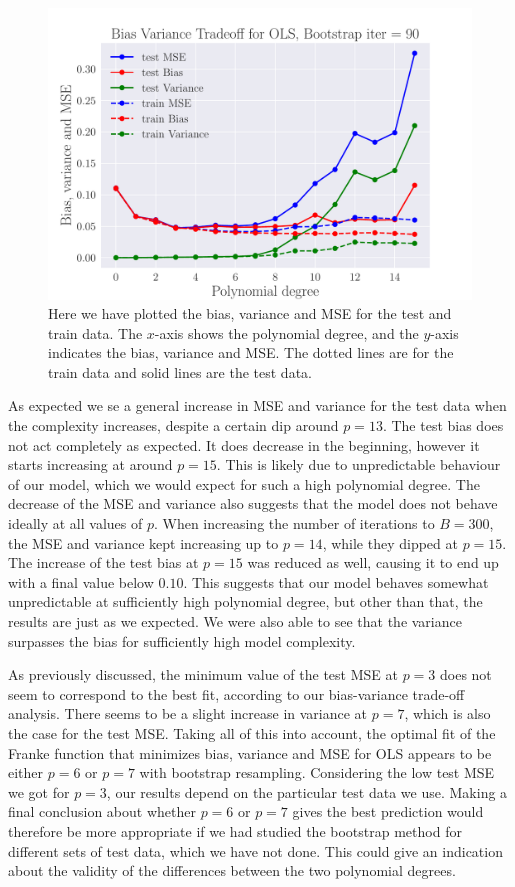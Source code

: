 \documentclass[reprint,english,notitlepage,aps,nobalancelastpage,nofootinbib]{revtex4-1}  %
\begin{document}
\begin{figure}[h]
	\includegraphics[width=\linewidth]{BVT_OLS_n30_eps0_2.pdf}
	\caption{Here we have plotted the bias, variance and MSE for the test and train data. The $x$-axis shows the polynomial degree, and the $y$-axis indicates the bias, variance and MSE. The dotted lines are for the train data and solid lines are the test data.}\label{fig:BV_OLS}
\end{figure}

As expected we se a general increase in MSE and variance for the test data when the complexity increases, despite a certain dip around $p=13$. The test bias does not act completely as expected. It does decrease in the beginning, however it starts increasing at around $p = 15$. This is likely due to unpredictable behaviour of our model, which we would expect for such a high polynomial degree. The decrease of the MSE and variance also suggests that the model does not behave ideally at all values of $p$. When increasing the number of iterations to $B=300$, the MSE and variance kept increasing up to $p=14$, while they dipped at $p=15$. The increase of the test bias at $p=15$ was reduced as well, causing it to end up with a final value below $0.10$. This suggests that our model behaves somewhat unpredictable at sufficiently high polynomial degree, but other than that, the results are just as we expected. We were also able to see that the variance surpasses the bias for sufficiently high model complexity.

As previously discussed, the minimum value of the test MSE at $p=3$ does not seem to correspond to the best fit, according to our bias-variance trade-off analysis. There seems to be a slight increase in variance at $p=7$, which is also the case for the test MSE. Taking all of this into account, the optimal fit of the Franke function that minimizes bias, variance and MSE for OLS appears to be either $p=6$ or $p=7$ with bootstrap resampling. Considering the low test MSE we got for $p=3$, our results depend on the particular test data we use. Making a final conclusion about whether $p=6$ or $p=7$ gives the best prediction would therefore be more appropriate if we had studied the bootstrap method for different sets of test data, which we have not done. This could give an indication about the validity of the differences between the two polynomial degrees.
\end{document}
